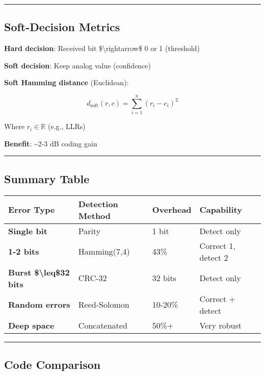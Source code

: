 \begin{center}\rule{0.5\linewidth}{0.5pt}\end{center}

\subsection{Soft-Decision Metrics}\label{soft-decision-metrics}

\textbf{Hard decision}: Received bit \$\textbackslash rightarrow\$ 0 or
1 (threshold)

\textbf{Soft decision}: Keep analog value (confidence)

\textbf{Soft Hamming distance} (Euclidean):

\[
d_{\text{soft}}(r, c) = \sum_{i=1}^{n} (r_i - c_i)^2
\]

Where \(r_i \in \mathbb{R}\) (e.g., LLRs)

\textbf{Benefit}: \textasciitilde2-3 dB coding gain

\begin{center}\rule{0.5\linewidth}{0.5pt}\end{center}

\subsection{Summary Table}\label{summary-table}

{\def\LTcaptype{} %
\begin{longtable}[]{@{}llll@{}}
\toprule\noalign{}
Error Type & Detection Method & Overhead & Capability \\
\midrule\noalign{}
\endhead
\bottomrule\noalign{}
\endlastfoot
\textbf{Single bit} & Parity & 1 bit & Detect only \\
\textbf{1-2 bits} & Hamming(7,4) & 43\% & Correct 1, detect 2 \\
\textbf{Burst \$\textbackslash leq\$32 bits} & CRC-32 & 32 bits & Detect
only \\
\textbf{Random errors} & Reed-Solomon & 10-20\% & Correct + detect \\
\textbf{Deep space} & Concatenated & 50\%+ & Very robust \\
\end{longtable}
}

\begin{center}\rule{0.5\linewidth}{0.5pt}\end{center}

\subsection{Code Comparison}\label{code-comparison}

